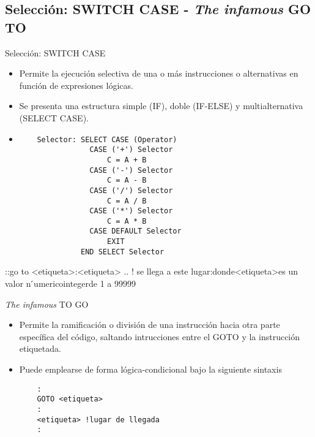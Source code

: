 
\subsection{Selección: SWITCH CASE - \textit{The infamous} GO TO}

\begin{frame}[fragile]{Selección: SWITCH CASE}  
 \begin{itemize}[<+(0)->]
  \item Permite la ejecución selectiva de una o más instrucciones o alternativas en función de expresiones lógicas.
  \item Se presenta una estructura simple (IF), doble (IF-ELSE) y multialternativa (SELECT CASE).
  \vspace{0.2cm}
  \item [] 
   \begin{verbatim}
    Selector: SELECT CASE (Operator)
                CASE ('+') Selector
                    C = A + B
                CASE ('-') Selector
                    C = A - B
                CASE ('/') Selector
                    C = A / B
                CASE ('*') Selector
                    C = A * B
                CASE DEFAULT Selector
                    EXIT
              END SELECT Selector
   \end{verbatim}
 \end{itemize}
\end{frame}
::go to <etiqueta>:<etiqueta> .. ! se llega a este lugar:donde<etiqueta>es un valor n ́umericointegerde 1 a 99999

\begin{frame}[fragile]{\textit{The infamous} TO GO}  
 \begin{itemize}[<+(0)->]
  \item Permite la ramificación o división de una instrucción hacia otra parte específica del código, saltando intrucciones entre el GOTO y la instrucción etiquetada.
  \item Puede emplearse de forma lógica-condicional bajo la siguiente sintaxis\\
    \begin{verbatim}
    :
    GOTO <etiqueta> 
    : 
    <etiqueta> !lugar de llegada
    :
    \end{verbatim}
 \end{itemize}
\end{frame}

